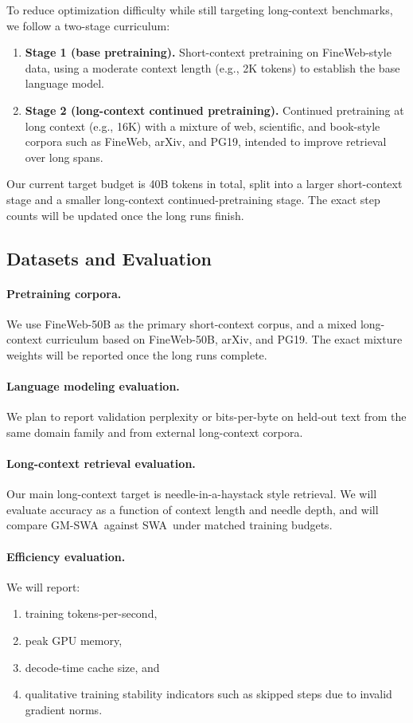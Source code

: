 \documentclass{article}
\newcommand{\model}{GM-SWA}
\newcommand{\baseline}{SWA}
\begin{document}
To reduce optimization difficulty while still targeting long-context benchmarks, we follow a two-stage curriculum:
\begin{enumerate}
    \item \textbf{Stage 1 (base pretraining).} Short-context pretraining on FineWeb-style data, using a moderate context length (e.g., 2K tokens) to establish the base language model.
    \item \textbf{Stage 2 (long-context continued pretraining).} Continued pretraining at long context (e.g., 16K) with a mixture of web, scientific, and book-style corpora such as FineWeb, arXiv, and PG19, intended to improve retrieval over long spans.
\end{enumerate}

Our current target budget is 40B tokens in total, split into a larger short-context stage and a smaller long-context continued-pretraining stage. The exact step counts will be updated once the long runs finish.

\subsection{Datasets and Evaluation}

\paragraph{Pretraining corpora.}
We use FineWeb-50B as the primary short-context corpus, and a mixed long-context curriculum based on FineWeb-50B, arXiv, and PG19. The exact mixture weights will be reported once the long runs complete.

\paragraph{Language modeling evaluation.}
We plan to report validation perplexity or bits-per-byte on held-out text from the same domain family and from external long-context corpora.

\paragraph{Long-context retrieval evaluation.}
Our main long-context target is needle-in-a-haystack style retrieval. We will evaluate accuracy as a function of context length and needle depth, and will compare \model\ against \baseline\ under matched training budgets.

\paragraph{Efficiency evaluation.}
We will report:
\begin{enumerate}
    \item training tokens-per-second,
    \item peak GPU memory,
    \item decode-time cache size, and
    \item qualitative training stability indicators such as skipped steps due to invalid gradient norms.
\end{enumerate}
\end{document}
